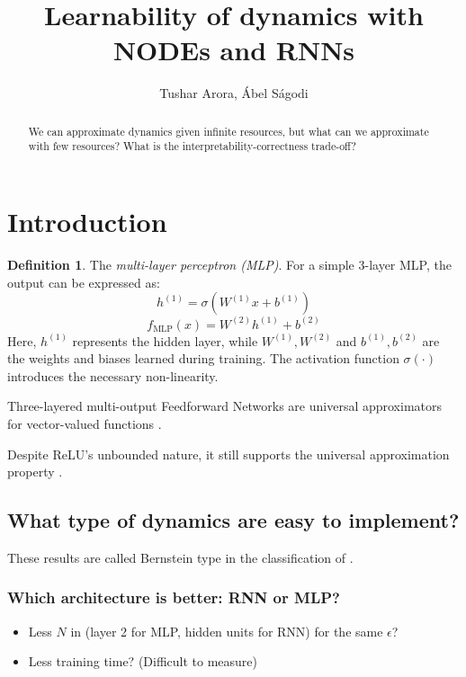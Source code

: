 \documentclass{article} %
\title{Learnability of dynamics with NODEs and RNNs}
\author{
    Tushar Arora, \'Abel S\'agodi
}
\theoremstyle{definition} \newtheorem{definition}{Definition}
\theoremstyle{remark} \newtheorem{remark}{Remark}
\begin{document}
\maketitle
\begin{abstract}
We can approximate dynamics given infinite resources, but what can we approximate with few resources?
What is the interpretability-correctness trade-off?
\end{abstract}

\section{Introduction}
\citep{oby2025dynamical}

\begin{definition}
The \textit{multi-layer perceptron (MLP)}. For a simple 3-layer MLP, the output can be expressed as:
\[
h^{(1)} = \sigma(W^{(1)} x + b^{(1)})
\]
\[
f_{\text{MLP}}(x) = W^{(2)} h^{(1)} + b^{(2)}
\]
Here, \(h^{(1)}\) represents the hidden layer, while \(W^{(1)}, W^{(2)}\) and \(b^{(1)}, b^{(2)}\) are the weights and biases learned during training. The activation function \(\sigma(\cdot)\) introduces the necessary non-linearity.
\end{definition}

Three-layered multi-output Feedforward Networks are universal approximators for vector-valued functions \citep{irie1988capabilities}.

Despite ReLU's unbounded nature, it still supports the universal approximation property \citep{yarotsky2017error}.



\subsection{What type of dynamics are easy to implement?}
These results are called Bernstein type in the classification of \cite{jiang2023brief}.


\subsubsection{Which architecture is better: RNN or MLP?}
\begin{itemize}
\item Less $N$ in (layer 2 for MLP, hidden units for RNN) for the same $\epsilon$?
\item Less training time? (Difficult to measure)
\end{itemize}
\end{document}
